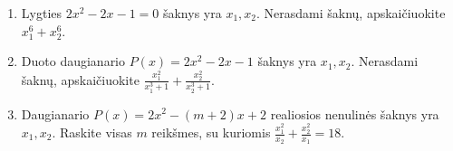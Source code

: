 \documentclass[11pt,a4paper]{article}
\begin{document}
\begin{enumerate}
\item \begin{minipage}[t]{\linewidth}Lygties \(2x^{2}-2x-1=0\) šaknys yra \(x_1,x_2\). Nerasdami šaknų, apskaičiuokite \mbox{\(x_{1}^{6} + x_{2}^{6}\)}.\end{minipage}
\item \begin{minipage}[t]{\linewidth}Duoto daugianario \(P(x)=2x^{2}-2x-1\) šaknys yra \(x_1,x_2\). Nerasdami šaknų, apskaičiuokite \mbox{\(\frac{x_{1}^{2}}{x_{1}^{3} + 1} + \frac{x_{2}^{2}}{x_{2}^{3} + 1}\)}.\end{minipage}
\item \begin{minipage}[t]{\linewidth}Daugianario \(P(x)=2x^{2}-\left(m + 2\right)x+2\) realiosios nenulinės šaknys yra \(x_1,x_2\). Raskite visas \(m\) reikšmes, su kuriomis \mbox{\(\frac{x_1^2}{x_2}+\frac{x_2^2}{x_1}=18\)}.\end{minipage}
\end{enumerate}
\clearpage
\end{document}

